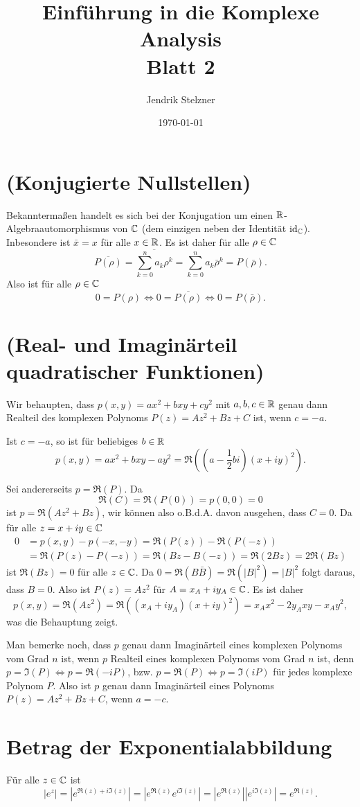 \documentclass[a4paper,10pt]{article}
\title{\sc Einführung in die Komplexe Analysis \\ \Large Blatt 2}
\author{Jendrik Stelzner}
\date{\today}
\begin{document}
\maketitle





\section{(Konjugierte Nullstellen)}
Bekanntermaßen handelt es sich bei der Konjugation um einen $\mathbb{R}$-Algebraauto\-morph\-ismus von $\mathbb{C}$ (dem einzigen neben der Identität $\operatorname{id}_{\mathbb{C}}$). Inbesondere ist $\bar{x} = x$ für alle $x \in \mathbb{R}$. Es ist daher für alle $\rho \in \mathbb{C}$
\[
 \overline{P(\rho)} = \overline{\sum_{k=0}^n a_k \rho^k} = \sum_{k=0}^n a_k \bar{\rho}^k = P(\bar{\rho}).
\]
Also ist für alle $\rho \in \mathbb{C}$
\[
 0 = P(\rho) \Leftrightarrow 0 = \overline{P(\rho)} \Leftrightarrow 0 = P(\bar{\rho}).
\]





\addtocounter{section}{1}





\section{(Real- und Imaginärteil quadratischer Funktionen)}
Wir behaupten, dass $p(x,y) = ax^2 + bxy + cy^2$ mit $a,b,c \in \mathbb{R}$ genau dann Realteil des komplexen Polynoms $P(z) = Az^2 + Bz + C$ ist, wenn $c = -a$.

Ist $c = -a$, so ist für beliebiges $b \in \mathbb{R}$
\[
 p(x,y) = ax^2 + bxy - ay^2 = \Re\left(\left(a-\frac{1}{2}bi\right)(x+iy)^2\right).
\]

Sei andererseits $p = \Re(P)$. Da
\[
 \Re(C) = \Re(P(0)) = p(0,0) = 0
\]
ist $p = \Re(Az^2+Bz)$, wir können also o.B.d.A. davon ausgehen, dass $C=0$. Da für alle $z = x+iy \in \mathbb{C}$
\begin{align*}
 0 &= p(x,y) - p(-x,-y) = \Re(P(z))-\Re(P(-z)) \\
   &= \Re(P(z)-P(-z)) = \Re(Bz - B(-z)) = \Re(2Bz) = 2 \Re(Bz)
\end{align*}
ist $\Re(Bz) = 0$ für alle $z \in \mathbb{C}$. Da $0 = \Re(B \bar{B}) = \Re(|B|^2)= |B|^2$ folgt daraus, dass $B = 0$. Also ist $P(z) = Az^2$ für $A = x_A + iy_A \in \mathbb{C}$. Es ist daher
\[
 p(x,y) = \Re(Az^2) = \Re((x_A+iy_A)(x+iy)^2) = x_Ax^2 - 2y_Axy - x_A y^2,
\]
was die Behauptung zeigt.

Man bemerke noch, dass $p$ genau dann Imaginärteil eines komplexen Polynoms vom Grad $n$ ist, wenn $p$ Realteil eines komplexen Polynoms vom Grad $n$ ist, denn $p = \Im(P) \Leftrightarrow p = \Re(-iP)$, bzw. $p = \Re(P) \Leftrightarrow p = \Im(iP)$ für jedes komplexe Polynom $P$. Also ist $p$ genau dann Imaginärteil eines Polynoms $P(z) = Az^2+Bz+C$, wenn $a = -c$.





\section{Betrag der Exponentialabbildung}
Für alle $z \in \mathbb{C}$ ist
\[
 |e^z| = \left|e^{\Re(z)+i\Im(z)}\right| = \left|e^{\Re(z)} e^{i\Im(z)}\right|
 = \left|e^{\Re(z)}\right| \left|e^{i\Im(z)}\right| = e^{\Re(z)}.
\]
\end{document}
